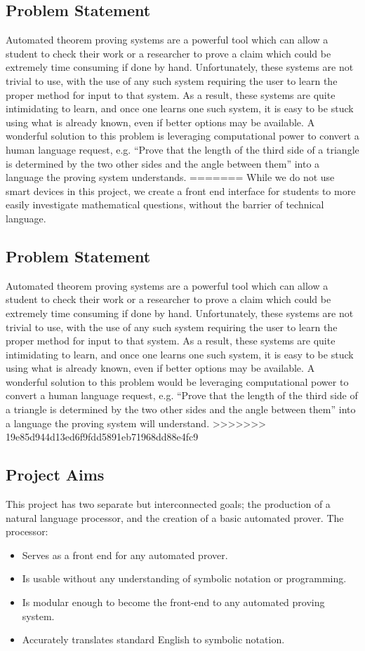 \documentclass[12pt]{article}
\begin{document}
\subsection{Problem Statement}
Automated theorem proving systems are a powerful tool which can allow a student to check their work or a researcher to prove a claim which could be extremely time consuming if done by hand. Unfortunately, these systems are not trivial to use, with the use of any such system requiring the user to learn the proper method for input to that system. As a result, these systems are quite intimidating to learn, and once one learns one such system, it is easy to be stuck using what is already known, even if better options may be available. A wonderful solution to this problem is leveraging computational power to convert a human language request, e.g. ``Prove that the length of the third side of a triangle is determined by the two other sides and the angle between them'' into a language the proving system understands.
=======
While we do not use smart devices in this project, we create a front end interface for students to more easily investigate mathematical questions, without the barrier of technical language.

\subsection{Problem Statement}
Automated theorem proving systems are a powerful tool which can allow a student to check their work or a researcher to prove a claim which could be extremely time consuming if done by hand. Unfortunately, these systems are not trivial to use, with the use of any such system requiring the user to learn the proper method for input to that system. As a result, these systems are quite intimidating to learn, and once one learns one such system, it is easy to be stuck using what is already known, even if better options may be available. A wonderful solution to this problem would be leveraging computational power to convert a human language request, e.g. ``Prove that the length of the third side of a triangle is determined by the two other sides and the angle between them'' into a language the proving system will understand.
>>>>>>> 19e85d944d13ed6f9fdd5891eb71968dd88e4fc9


\subsection{Project Aims}
This project has two separate but interconnected goals; the production of a natural language processor, and the creation of a basic automated prover. The processor:
\begin{itemize}
\item{Serves as a front end for any automated prover.}
\item{Is usable without any understanding of symbolic notation or programming.}
\item{Is modular enough to become the front-end to any automated proving system.}
\item{Accurately translates standard English to symbolic notation.}
\end{itemize}
\end{document}
